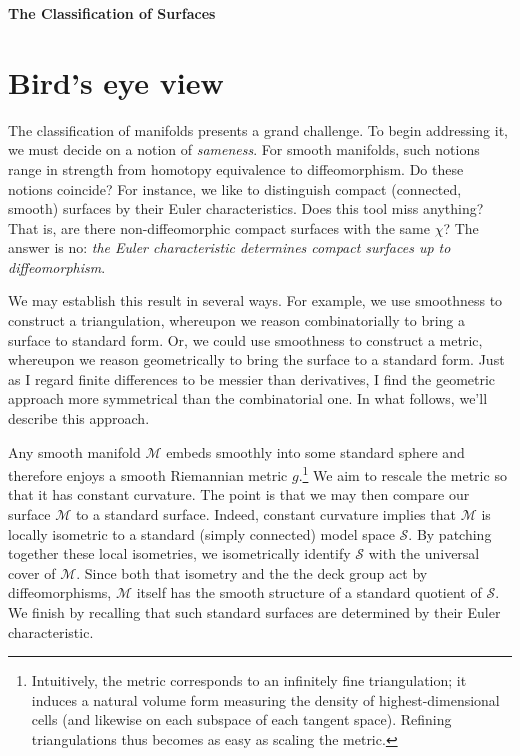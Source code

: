 \documentclass[11pt, justified]{tufte-book}
\newcommand{\Mm}{\mathcal{M}}
\newcommand{\Ss}{\mathcal{S}}
\theoremstyle{definition}
\newcommand{\mtit}[1]{%
    {%
        \noindent
        \Huge\color{mblu}\bf\textsf{#1}
        \vspace{0.3cm}
    }
}
\newcommand{\msec}[1]{\section{\color{mblu}\textsf{#1}}}
\begin{document}
    \mtit{The Classification of Surfaces}
    \msec{Bird's eye view}
        The classification of manifolds presents a grand challenge.  To begin
        addressing it, we must decide on a notion of \textit{sameness}.  For
        smooth manifolds, such notions range in strength from homotopy
        equivalence to diffeomorphism.  Do these notions coincide?
        For instance, we like to distinguish compact (connected, smooth)
        surfaces by their Euler characteristics.  Does this tool miss anything?
        That is, are there non-diffeomorphic compact surfaces with the same
        $\chi$? 
        The answer is no: \textit{the Euler characteristic determines compact
        surfaces up to diffeomorphism}.

        We may establish this result in several ways.  For example, we use
        smoothness to construct a triangulation, whereupon we reason
        combinatorially to bring a surface to standard form.  Or, we could use
        smoothness to construct a metric, whereupon we reason
        geometrically to bring the surface to a standard form.
        Just as I regard finite differences to be messier than derivatives, I
        find the geometric approach more symmetrical than the combinatorial
        one.  In what follows, we'll describe this approach.

        Any smooth manifold $\Mm$ embeds smoothly into some standard sphere and
        therefore enjoys a smooth Riemannian metric $g$.\footnote{
            Intuitively, the metric corresponds to an infinitely fine
            triangulation; it induces a natural volume form measuring the
            density of highest-dimensional cells (and likewise on each subspace
            of each tangent space).  Refining triangulations thus becomes as
            easy as scaling the metric.
        }
        We aim to rescale the metric so that it has constant curvature.  The
        point is that we may then compare our surface $\Mm$ to a standard
        surface.  Indeed, constant curvature implies that $\Mm$ is locally
        isometric to a standard (simply connected) model space $\Ss$.  By
        patching together these local isometries, we isometrically identify
        $\Ss$ with the universal cover of $\Mm$.  Since both that isometry and
        the the deck group act by diffeomorphisms, $\Mm$ itself has the smooth
        structure of a standard quotient of $\Ss$.  We finish by recalling that
        such standard surfaces are determined by their Euler characteristic. 
\end{document}

